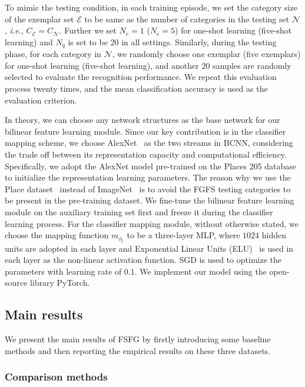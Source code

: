 \documentclass[10pt,twocolumn,letterpaper]{article}
\begin{document}
To mimic the testing condition, in each training episode, we set the category size of the exemplar set $\mathcal{E}$ to be same as the number of categories in the testing set $\mathcal{N}$, \emph{i.e.}, $C_{\mathcal{E}} = C_{\mathcal{N}}$. Further we set $N_e=1$ ($N_e=5$) for one-shot learning (five-shot learning) and $N_q$ is set to be $20$ in all settings. Similarly, during the testing phase, for each category in $\mathcal{N}$, we randomly choose one exemplar (five exemplars) for one-shot learning (five-shot learning), and another $20$ samples are randomly selected to evaluate the recognition performance. We repeat this evaluation process twenty times, and the mean classification accuracy is used as the evaluation criterion.

In theory, we can choose any network structures as the base network for our bilinear feature learning module. Since our key contribution is in the classifier mapping scheme, we choose AlexNet~\cite{cnn12} as the two streams in BCNN, considering the trade off between its representation capacity and computational efficiency. Specifically, we adopt the AlexNet model pre-trained on the Places 205 database~\cite{placescnn} to initialize the representation learning parameters. The reason why we use the Place dataset~\cite{placescnn} instead of ImageNet~\cite{ILSVRC15} is to avoid the FGFS testing categories to be present in the pre-training dataset. We fine-tune the bilinear feature learning module on the auxiliary training set first and freeze it during the classifier learning process. For the classifier mapping module, without otherwise stated, we choose the mapping function $m_{\phi_t}$ to be a three-layer MLP, where $1024$ hidden units are adopted in each layer and Exponential Linear Units (ELU)~\cite{elu} is used in each layer as the non-linear activation function. SGD is used to optimize the parameters with learning rate of $0.1$. We implement our model using the open-source library PyTorch.%

\subsection{Main results}

We present the main results of FSFG by firstly introducing some baseline methods and then reporting the empirical results on these three datasets.

\subsubsection{Comparison methods}
\end{document}
